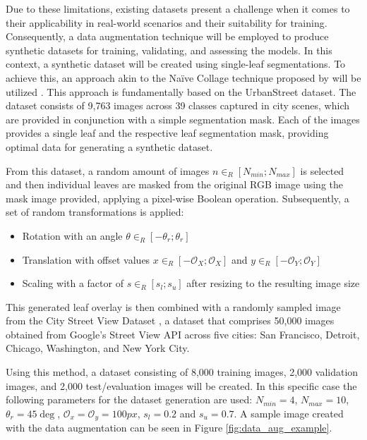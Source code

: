 \documentclass[draft,final]{vutinfth} %
\begin{document}
Due to these limitations, existing datasets present a challenge when it comes to their applicability in real-world scenarios and their suitability for training. Consequently, a data augmentation technique will be employed to produce synthetic datasets for training, validating, and assessing the models.
In this context, a synthetic dataset will be created using single-leaf segmentations. To achieve this, an approach akin to the Na\"ive Collage technique proposed by \citeauthor{kuznichov_data_2019} will be utilized \cite{kuznichov_data_2019}.
This approach is fundamentally based on the UrbanStreet \cite{yang_urban_2023} dataset. The dataset consists of 9,763 images across 39 classes captured in city scenes, which are provided in conjunction with a simple segmentation mask. Each of the images provides a single leaf and the respective leaf segmentation mask, providing optimal data for generating a synthetic dataset.

From this dataset, a random amount of images $n \in_R [N_{min};N_{max}]$ is selected and then individual leaves are masked from the original RGB image using the mask image provided, applying a pixel-wise Boolean operation. Subsequently, a set of random transformations is applied:
\begin{itemize}
    \item Rotation with an angle $\theta \in_R [-\theta_r; \theta_r]$
    \item Translation with offset values $x \in_R [-\mathcal{O}_X; \mathcal{O}_X]$ and $y \in_R [-\mathcal{O}_Y; \mathcal{O}_Y]$
    \item Scaling with a factor of $s \in_R [s_l; s_u]$ after resizing to the resulting image size
\end{itemize}

This generated leaf overlay is then combined with a randomly sampled image from the City Street View Dataset \cite{stealth_username_city_2022}, a dataset that comprises 50,000 images obtained from Google's Street View API across five cities: San Francisco, Detroit, Chicago, Washington, and New York City. 

Using this method, a dataset consisting of 8,000 training images, 2,000 validation images, and 2,000 test/evaluation images will be created.
In this specific case the following parameters for the dataset generation are used: $N_{min} = 4$, $N_{max} = 10$, $\theta_r = 45\deg$, $\mathcal{O}_x = \mathcal{O}_y = 100px$, $s_l = 0.2$ and $s_u = 0.7$.
A sample image created with the data augmentation can be seen in Figure \ref{fig:data_aug_example}.
\end{document}

